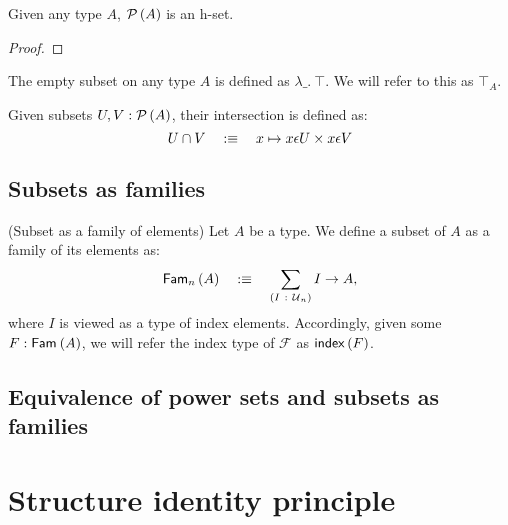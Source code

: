 \begin{prop}\label{isSetPow}
  Given any type $A$, $\mathcal{P}\left(A\right)$ is an h-set.
\end{prop}
\begin{proof}
\end{proof}

\begin{defn}\label{defn:full-set}
  The empty subset on any type $A$ is defined as $\lambda\_.~ \top$. We will refer to this as
  $\top_A$.
\end{defn}

\begin{defn}\label{defn:set-intersection}
  Given subsets $U, V : \mathcal{P}\left(A\right)$, their intersection is defined as:
  \begin{equation*}
    U \cap V \quad:\equiv\quad x \mapsto x \epsilon U \times x \epsilon V
  \end{equation*}
\end{defn}

\subsection{Subsets as families}

\begin{defn}(Subset as a family of elements)\label{defn:fam}
  Let $A$ be a type. We define a subset of $A$ as a family of its elements as:
  \begin{equation*}
    \mathsf{Fam}_{n}\left(A\right) \quad:\equiv\quad \sum_{(I~:~\mathcal{U}{}_n)} I \rightarrow A,
  \end{equation*}
  where $I$ is viewed as a type of index elements. Accordingly, given some $F : \mathsf{Fam}_{}\left(A\right)$,
  we will refer the index type of $\mathcal{F}$ as $\mathsf{index}{}\left(F\right)$.
\end{defn}

\subsection{Equivalence of power sets and subsets as families}


\section{Structure identity principle}\label{sec:sip}
